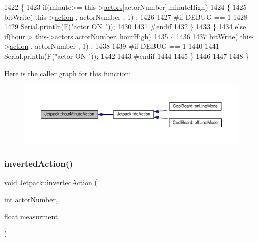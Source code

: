 \begin{DoxyCode}
1422     \{
1423         \textcolor{keywordflow}{if}(minute>= this->\hyperlink{class_jetpack_a7e16d2f97837f9712a2e6de1c50d99db}{actors}[actorNumber].minuteHigh)
1424         \{
1425             bitWrite( this->\hyperlink{class_jetpack_aca3142925a7b0834b34ae91d26af7765}{action} , actorNumber , 1) ;
1426 
1427 \textcolor{preprocessor}{        #if DEBUG == 1 }
1428 
1429             Serial.println(F(\textcolor{stringliteral}{"actor ON "}));
1430 
1431 \textcolor{preprocessor}{        #endif  }
1432         \}
1433     \}
1434     \textcolor{keywordflow}{else} \textcolor{keywordflow}{if}(hour > this->\hyperlink{class_jetpack_a7e16d2f97837f9712a2e6de1c50d99db}{actors}[actorNumber].hourHigh)
1435     \{
1436 
1437         bitWrite( this->\hyperlink{class_jetpack_aca3142925a7b0834b34ae91d26af7765}{action} , actorNumber , 1) ;
1438 
1439 \textcolor{preprocessor}{    #if DEBUG == 1 }
1440 
1441         Serial.println(F(\textcolor{stringliteral}{"actor ON "}));
1442 
1443 \textcolor{preprocessor}{    #endif      }
1444 
1445     \}
1446 
1447     
1448 \}
\end{DoxyCode}
Here is the caller graph for this function\+:\nopagebreak
\begin{figure}[H]
\begin{center}
\leavevmode
\includegraphics[width=350pt]{df/d1d/class_jetpack_ae01c13c785ebdf1b0bb5500234aba1bd_icgraph}
\end{center}
\end{figure}
\mbox{\label{class_jetpack_adacfc35fab4a621357caf98ce1c9cb54}} 
\subsubsection{\texorpdfstring{inverted\+Action()}{invertedAction()}}
{\footnotesize\ttfamily void Jetpack\+::inverted\+Action (\begin{DoxyParamCaption}\item[{int}]{actor\+Number,  }\item[{float}]{measurment }\end{DoxyParamCaption})}

